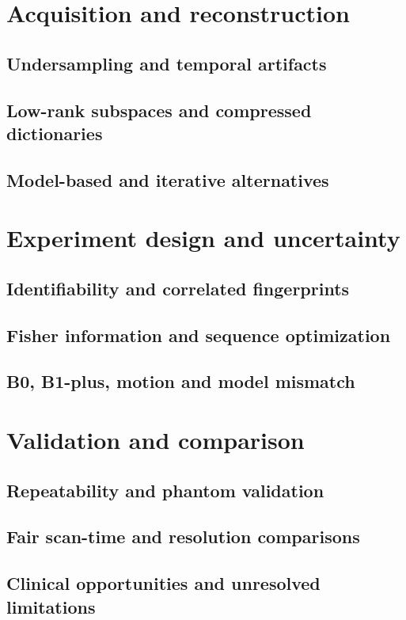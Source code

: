 \section{Acquisition and reconstruction}
\label{sec:12:acquisition-and-reconstruction}
\subsection{Undersampling and temporal artifacts}
\subsection{Low-rank subspaces and compressed dictionaries}
\subsection{Model-based and iterative alternatives}

\section{Experiment design and uncertainty}
\label{sec:12:experiment-design-and-uncertainty}
\subsection{Identifiability and correlated fingerprints}
\subsection{Fisher information and sequence optimization}
\subsection{B0, B1-plus, motion and model mismatch}

\section{Validation and comparison}
\label{sec:12:validation-and-comparison}
\subsection{Repeatability and phantom validation}
\subsection{Fair scan-time and resolution comparisons}
\subsection{Clinical opportunities and unresolved limitations}


